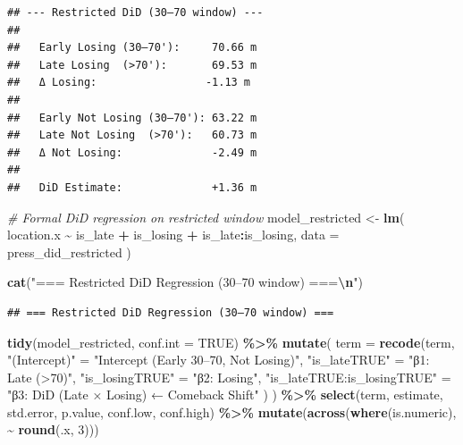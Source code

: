 \documentclass[
]{article}
\newenvironment{Shaded}{\begin{snugshade}}{\end{snugshade}}
\newcommand{\AttributeTok}[1]{\textcolor[rgb]{0.13,0.29,0.53}{#1}}
\newcommand{\CommentTok}[1]{\textcolor[rgb]{0.56,0.35,0.01}{\textit{#1}}}
\newcommand{\ConstantTok}[1]{\textcolor[rgb]{0.56,0.35,0.01}{#1}}
\newcommand{\DecValTok}[1]{\textcolor[rgb]{0.00,0.00,0.81}{#1}}
\newcommand{\FunctionTok}[1]{\textcolor[rgb]{0.13,0.29,0.53}{\textbf{#1}}}
\newcommand{\NormalTok}[1]{#1}
\newcommand{\OtherTok}[1]{\textcolor[rgb]{0.56,0.35,0.01}{#1}}
\newcommand{\SpecialCharTok}[1]{\textcolor[rgb]{0.81,0.36,0.00}{\textbf{#1}}}
\newcommand{\StringTok}[1]{\textcolor[rgb]{0.31,0.60,0.02}{#1}}
\begin{document}
\begin{verbatim}
## --- Restricted DiD (30–70 window) ---
## 
##   Early Losing (30–70'):     70.66 m
##   Late Losing  (>70'):       69.53 m
##   Δ Losing:                 -1.13 m
## 
##   Early Not Losing (30–70'): 63.22 m
##   Late Not Losing  (>70'):   60.73 m
##   Δ Not Losing:              -2.49 m
## 
##   DiD Estimate:              +1.36 m
\end{verbatim}

\begin{Shaded}
\begin{Highlighting}[]
\CommentTok{\# Formal DiD regression on restricted window}
\NormalTok{model\_restricted }\OtherTok{\textless{}{-}} \FunctionTok{lm}\NormalTok{(}
\NormalTok{  location.x }\SpecialCharTok{\textasciitilde{}}\NormalTok{ is\_late }\SpecialCharTok{+}\NormalTok{ is\_losing }\SpecialCharTok{+}\NormalTok{ is\_late}\SpecialCharTok{:}\NormalTok{is\_losing,}
  \AttributeTok{data =}\NormalTok{ press\_did\_restricted}
\NormalTok{)}

\FunctionTok{cat}\NormalTok{(}\StringTok{"=== Restricted DiD Regression (30–70 window) ===}\SpecialCharTok{\textbackslash{}n}\StringTok{"}\NormalTok{)}
\end{Highlighting}
\end{Shaded}

\begin{verbatim}
## === Restricted DiD Regression (30–70 window) ===
\end{verbatim}

\begin{Shaded}
\begin{Highlighting}[]
\FunctionTok{tidy}\NormalTok{(model\_restricted, }\AttributeTok{conf.int =} \ConstantTok{TRUE}\NormalTok{) }\SpecialCharTok{\%\textgreater{}\%}
  \FunctionTok{mutate}\NormalTok{(}
    \AttributeTok{term =} \FunctionTok{recode}\NormalTok{(term,}
      \StringTok{"(Intercept)"}               \OtherTok{=} \StringTok{"Intercept (Early 30–70\textquotesingle{}, Not Losing)"}\NormalTok{,}
      \StringTok{"is\_lateTRUE"}               \OtherTok{=} \StringTok{"β1: Late (\textgreater{}70\textquotesingle{})"}\NormalTok{,}
      \StringTok{"is\_losingTRUE"}             \OtherTok{=} \StringTok{"β2: Losing"}\NormalTok{,}
      \StringTok{"is\_lateTRUE:is\_losingTRUE"} \OtherTok{=} \StringTok{"β3: DiD (Late × Losing) ← Comeback Shift"}
\NormalTok{    )}
\NormalTok{  ) }\SpecialCharTok{\%\textgreater{}\%}
  \FunctionTok{select}\NormalTok{(term, estimate, std.error, p.value, conf.low, conf.high) }\SpecialCharTok{\%\textgreater{}\%}
  \FunctionTok{mutate}\NormalTok{(}\FunctionTok{across}\NormalTok{(}\FunctionTok{where}\NormalTok{(is.numeric), }\SpecialCharTok{\textasciitilde{}} \FunctionTok{round}\NormalTok{(.x, }\DecValTok{3}\NormalTok{)))}
\end{Highlighting}
\end{Shaded}
\end{document}
